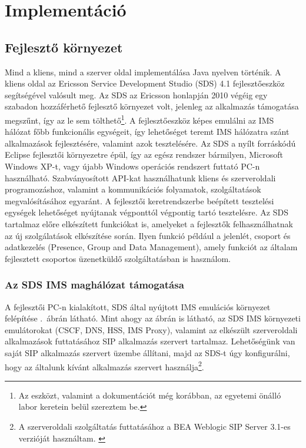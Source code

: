 \section{Implementáció}

\subsection{Fejlesztő környezet}

Mind a kliens, mind a szerver oldal implementálása Java nyelven történik. A kliens oldal az Ericsson Service Development Studio (SDS) 4.1 fejlesztőeszköz segítségével valósult meg. Az SDS az Ericsson honlapján 2010 végéig egy szabadon hozzáférhető fejlesztő környezet volt, jelenleg az alkalmazás támogatása megszűnt, így az le sem tölthető\footnote{Az eszközt, valamint a dokumentációt még korábban, az egyetemi önálló labor keretein belül szereztem be.}. A fejlesztőeszköz képes emulálni az IMS hálózat főbb funkcionális egységeit, így lehetőséget teremt IMS hálózatra szánt alkalmazások fejlesztésére, valamint azok tesztelésére. Az SDS a nyílt forráskódú Eclipse fejlesztői környezetre épül, így az egész rendszer bármilyen, Microsoft Windows XP-t, vagy újabb Windows operációs rendszert futtató PC-n használható. Szabványosított API-kat használhatunk kliens és szerveroldali programozáshoz, valamint a kommunikációs folyamatok, szolgáltatások megvalósításához egyaránt. A fejlesztői keretrendszerbe beépített tesztelési egységek lehetőséget nyújtanak végponttól végpontig tartó tesztelésre. Az SDS tartalmaz előre elkészített funkciókat is, amelyeket a fejlesztők felhasználhatnak az új szolgálatások elkészítése során. Ilyen funkció például a jelenlét, csoport és adatkezelés (Presence, Group and Data Management), amely funkciót az általam fejlesztett csoportos üzenetküldő szolgáltatásban is használom.

\subsubsection{Az SDS IMS maghálózat támogatása}

A fejlesztői PC-n kialakított, SDS által nyújtott IMS emulációs környezet felépítése .~ábrán  látható. Mint ahogy az ábrán is látható, az SDS IMS környezeti emulátorokat (CSCF, DNS, HSS, IMS Proxy), valamint az elkészült szerveroldali alkalmazások futtatásához SIP alkalmazás szervert tartalmaz. Lehetőségünk van saját SIP alkalmazás szervert üzembe állítani, majd az SDS-t úgy konfigurálni, hogy az általunk kívánt alkalmazás szervert használja\footnote{A szerveroldali szolgáltatás futtatásához a BEA Weblogic SIP Server 3.1-es verzióját használtam. \cite{bea_weblogic}}. 

